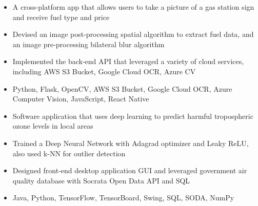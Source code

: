 \documentclass[11pt,letterpaper]{article}
\begin{document}
  \ifmilesnap
    {\fontsize{12}{12}}

    \begin{itemize}
      \item{A cross-platform app that allows users to take a picture of a gas station sign and receive fuel type and price}

      \item{Devised an image post-processing spatial algorithm to extract fuel data, and an image pre-processing bilateral blur algorithm}

      \item{Implemented the back-end API that leveraged a variety of cloud services, including AWS S3 Bucket, Google Cloud OCR, Azure CV}

      \item{
        {}
        Python, Flask, OpenCV, AWS S3 Bucket, Google Cloud OCR, Azure Computer Vision, JavaScript, React Native
      }
    \end{itemize}
  \fi

  \ifdeeplearningfortroposphericozoneprediction
    {\fontsize{12}{12}}

    \begin{itemize}
      \item{Software application that uses deep learning to predict harmful tropospheric ozone levels in local areas}
      
          \item{Trained a Deep Neural Network with Adagrad optimizer and Leaky ReLU, also used k-NN for outlier detection}
      
      \item{Designed front-end desktop application GUI and leveraged government air quality database with Socrata Open Data API and SQL}

      \item{
        {}
        Java, Python, TensorFlow, TensorBoard, Swing, SQL, SODA, NumPy
      }
    \end{itemize}
  \fi

  \bigskip
\end{document}
